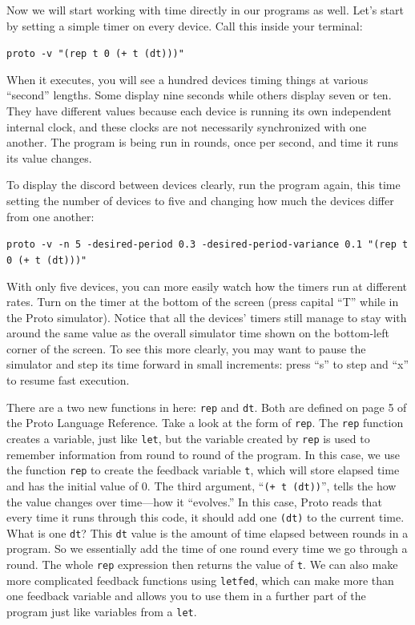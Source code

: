 \documentclass{article}
\newcommand\code[1]{\begin{center}\var{#1}\end{center}}
\newcommand\var[1]{{\tt #1}}
\newcommand\qvar[1]{``{\tt #1}''}
\begin{document}
Now we will start working with time directly in our programs as well.
Let's start by setting a simple timer on every device.  Call this
inside your terminal:

\code{proto -v "(rep t 0 (+ t (dt)))"}
	
When it executes, you will see a hundred devices timing things at
various ``second'' lengths.  Some display nine seconds while others
display seven or ten.  They have different values because each device
is running its own independent internal clock, and these clocks are
not necessarily synchronized with one another.  The program is being
run in rounds, once per second, and time it runs its value changes.

To display the discord between devices clearly, run the program again,
this time setting the number of devices to five and changing how much
the devices differ from one another:

\code{proto -v -n 5 -desired-period 0.3 -desired-period-variance 0.1 "(rep t 0 (+ t (dt)))"}

With only five devices, you can more easily watch how the timers run
at different rates.  Turn on the timer at the bottom of the screen
(press capital ``T'' while in the Proto simulator).  Notice that all
the devices' timers still manage to stay with around the same value as
the overall simulator time shown on the bottom-left corner of the
screen.  To see this more clearly, you may want to pause the simulator
and step its time forward in small increments: press ``s'' to step and
``x'' to resume fast execution.

There are a two new functions in here: \var{rep} and \var{dt}.  Both
are defined on page 5 of the Proto Language Reference.  Take a look at
the form of \var{rep}.  The \var{rep} function creates a variable,
just like \var{let}, but the variable created by \var{rep} is used to
remember information from round to round of the program.  In this
case, we use the function \var{rep} to create the feedback variable
\var{t}, which will store elapsed time and has the initial value of 0.
The third argument, \qvar{(+ t (dt))}, tells the how the value changes
over time---how it ``evolves.''  In this case, Proto reads that every
time it runs through this code, it should add one \var{(dt)} to the
current time.  What is one \var{dt}?  This \var{dt} value is the
amount of time elapsed between rounds in a program.  So we essentially
add the time of one round every time we go through a round.  The whole
\var{rep} expression then returns the value of \var{t}.  We can also
make more complicated feedback functions using \var{letfed}, which can
make more than one feedback variable and allows you to use them in a
further part of the program just like variables from a \var{let}.
\end{document}
